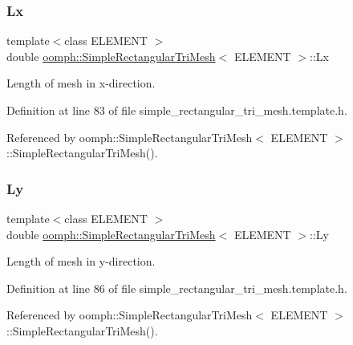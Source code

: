 \subsubsection{\texorpdfstring{Lx}{Lx}}
{\footnotesize\ttfamily template$<$class E\+L\+E\+M\+E\+NT $>$ \\
double \hyperlink{classoomph_1_1SimpleRectangularTriMesh}{oomph\+::\+Simple\+Rectangular\+Tri\+Mesh}$<$ E\+L\+E\+M\+E\+NT $>$\+::Lx\hspace{0.3cm}{\ttfamily [private]}}



Length of mesh in x-\/direction. 



Definition at line 83 of file simple\+\_\+rectangular\+\_\+tri\+\_\+mesh.\+template.\+h.



Referenced by oomph\+::\+Simple\+Rectangular\+Tri\+Mesh$<$ E\+L\+E\+M\+E\+N\+T $>$\+::\+Simple\+Rectangular\+Tri\+Mesh().

\mbox{\label{classoomph_1_1SimpleRectangularTriMesh_adc35409d2a480d6de11d8df4ec23d1cf}} 
\subsubsection{\texorpdfstring{Ly}{Ly}}
{\footnotesize\ttfamily template$<$class E\+L\+E\+M\+E\+NT $>$ \\
double \hyperlink{classoomph_1_1SimpleRectangularTriMesh}{oomph\+::\+Simple\+Rectangular\+Tri\+Mesh}$<$ E\+L\+E\+M\+E\+NT $>$\+::Ly\hspace{0.3cm}{\ttfamily [private]}}



Length of mesh in y-\/direction. 



Definition at line 86 of file simple\+\_\+rectangular\+\_\+tri\+\_\+mesh.\+template.\+h.



Referenced by oomph\+::\+Simple\+Rectangular\+Tri\+Mesh$<$ E\+L\+E\+M\+E\+N\+T $>$\+::\+Simple\+Rectangular\+Tri\+Mesh().

\mbox{\label{classoomph_1_1SimpleRectangularTriMesh_ad997a3ce1ed243b79cd49eb5a0687844}} 
